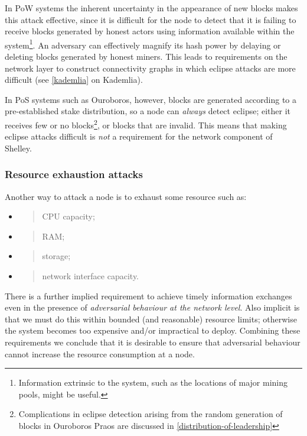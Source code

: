 \documentclass[11pt,a4paper]{article}
\begin{document}
In PoW systems the inherent uncertainty in the appearance of new blocks
makes this attack effective, since it is difficult for the node to
detect that it is failing to receive blocks generated by honest actors
using information available within the system\footnote{Information
  extrinsic to the system, such as the locations of major mining pools,
  might be useful.}. An adversary can effectively magnify its hash power
by delaying or deleting blocks generated by honest miners. This leads to
requirements on the network layer to construct connectivity graphs in
which eclipse attacks are more difficult (see
\cref{kademlia} on Kademlia).

In PoS systems such as Ouroboros, however, blocks are generated
according to a pre-established stake distribution, so a node can
\emph{always} detect eclipse; either it receives few or no
blocks\footnote{Complications in eclipse detection arising from the
  random generation of blocks in Ouroboros Praos are discussed in
  \cref{distribution-of-leadership}}, or
blocks that are invalid. This means that making eclipse attacks
difficult is \emph{not} a requirement for the network component of
Shelley.

\subsubsection{Resource exhaustion attacks}
\label{resource-exhaustion-attacks}

Another way to attack a node is to exhaust some resource such as:

\begin{itemize}
\item
  \begin{quote}
  CPU capacity;
  \end{quote}
\item
  \begin{quote}
  RAM;
  \end{quote}
\item
  \begin{quote}
  storage;
  \end{quote}
\item
  \begin{quote}
  network interface capacity.
  \end{quote}
\end{itemize}

There is a further implied requirement to achieve timely information
exchanges even in the presence of \emph{adversarial behaviour at the
network level}. Also implicit is that we must do this within bounded
(and reasonable) resource limits; otherwise the system becomes too
expensive and/or impractical to deploy. Combining these requirements we
conclude that it is desirable to ensure that adversarial behaviour
cannot increase the resource consumption at a node.
\end{document}
